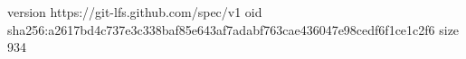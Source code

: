 version https://git-lfs.github.com/spec/v1
oid sha256:a2617bd4c737e3c338baf85e643af7adabf763cae436047e98cedf6f1ce1c2f6
size 934
